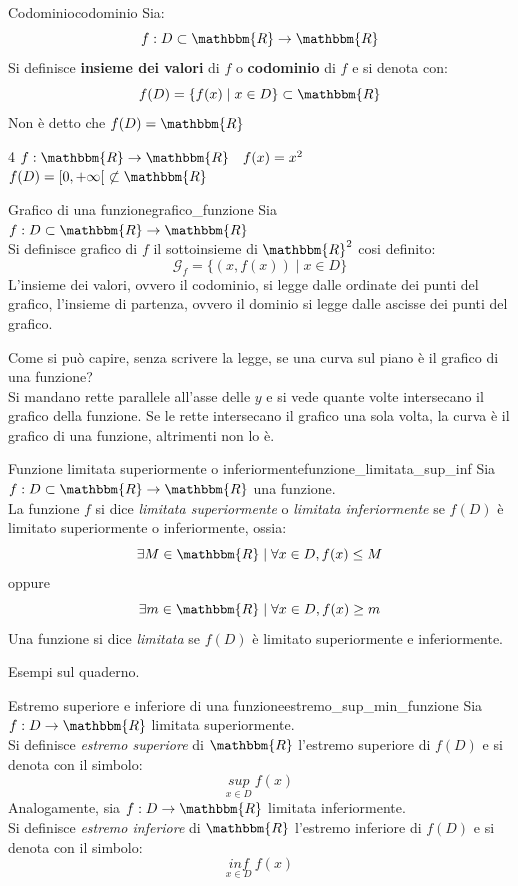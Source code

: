 \documentclass[12pt]{report}
\newcounter{definition}
\newcounter{exercise}
\begin{document}
	\begin{definition}{Codominio}{codominio}
		Sia:
		\[
		f: D \subset \mathbbm{R} \to \mathbbm{R}
		\]
		Si definisce \textbf{insieme dei valori} di $f$ o \textbf{codominio} di $f$ e si denota con:
		\[
		f(D) = \{f(x) \mid x \in D \} \subset \mathbbm{R}
		\]
		Non è detto che $f(D) = \mathbbm{R}$
	\end{definition}
	\begin{exercise}{}{4}
		$f: \mathbbm{R} \to \mathbbm{R} \quad f(x) = x^2$ \\
		$f(D) = [0, +\infty[\ \not \subset \mathbbm{R}$
	\end{exercise}
	\begin{definition}{Grafico di una funzione}{grafico_funzione}
		Sia $f: D \subset \mathbbm{R} \to \mathbbm{R}$ \\
		Si definisce grafico di $f$ il sottoinsieme di $\mathbbm{R}^2$ cosi definito:
		\[
		\mathscr{G}_f = \{(x, f(x)) \mid x \in D\}
		\]
		L'insieme dei valori, ovvero il codominio, si legge dalle ordinate dei punti del grafico, l'insieme di partenza, ovvero il dominio si legge dalle ascisse dei punti del grafico.
	\end{definition}
	\begin{note}{}{}
		Come si può capire, senza scrivere la legge, se una curva sul piano è il grafico di una funzione? \\
		Si mandano rette parallele all'asse delle $y$ e si vede quante volte intersecano il grafico della funzione. Se le rette intersecano il grafico una sola volta, la curva è  il grafico di una funzione, altrimenti non lo è.
	\end{note}
	\begin{definition}{Funzione limitata superiormente o inferiormente}{funzione_limitata_sup_inf}
		Sia $f: D \subset \mathbbm{R} \to \mathbbm{R}$ una funzione. \\
		La funzione $f$ si dice \textit{limitata superiormente} o \textit{limitata inferiormente} se $f(D)$ è limitato superiormente o inferiormente, ossia:
		\[
		\exists M \in \mathbbm{R} \mid \forall x \in D, f(x) \leq M
		\]
		oppure
		\[
		\exists m \in \mathbbm{R} \mid \forall x \in D, f(x) \geq m
		\]
		Una funzione si dice \textit{limitata} se $f(D)$ è limitato superiormente e inferiormente.
	\end{definition}
	Esempi sul quaderno. \\
	\begin{definition}{Estremo superiore e inferiore di una funzione}{estremo_sup_min_funzione}
		Sia $f: D \to \mathbbm{R}$ limitata superiormente. \\
		Si definisce \textit{estremo superiore} di $\mathbbm{R}$ l'estremo superiore di $f(D)$ e si denota con il simbolo: \\
		\[
		\underset{x \in D}{sup}\ f(x)
		\]
		Analogamente, sia $f: D \to \mathbbm{R}$ limitata inferiormente. \\
		Si definisce \textit{estremo inferiore} di $\mathbbm{R}$ l'estremo inferiore di $f(D)$ e si denota con il simbolo:
		\[
		\underset{x \in D}{inf}\ f(x)
		\]

	\end{definition}
\end{document}
